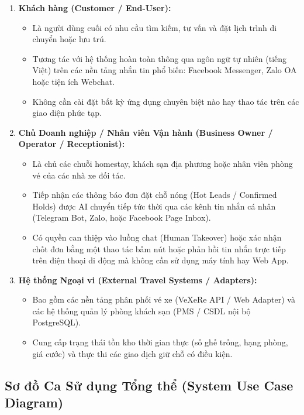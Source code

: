 \begin{enumerate}
    \item \textbf{Khách hàng (Customer / End-User):}
    \begin{itemize}
        \item Là người dùng cuối có nhu cầu tìm kiếm, tư vấn và đặt lịch trình di chuyển hoặc lưu trú.
        \item Tương tác với hệ thống hoàn toàn thông qua ngôn ngữ tự nhiên (tiếng Việt) trên các nền tảng nhắn tin phổ biến: Facebook Messenger, Zalo OA hoặc tiện ích Webchat.
        \item Không cần cài đặt bất kỳ ứng dụng chuyên biệt nào hay thao tác trên các giao diện phức tạp.
    \end{itemize}

    \item \textbf{Chủ Doanh nghiệp / Nhân viên Vận hành (Business Owner / Operator / Receptionist):}
    \begin{itemize}
        \item Là chủ các chuỗi homestay, khách sạn địa phương hoặc nhân viên phòng vé của các nhà xe đối tác.
        \item Tiếp nhận các thông báo đơn đặt chỗ nóng (Hot Leads / Confirmed Holds) được AI chuyển tiếp tức thời qua các kênh tin nhắn cá nhân (Telegram Bot, Zalo, hoặc Facebook Page Inbox).
        \item Có quyền can thiệp vào luồng chat (Human Takeover) hoặc xác nhận chốt đơn bằng một thao tác bấm nút hoặc phản hồi tin nhắn trực tiếp trên điện thoại di động mà không cần sử dụng máy tính hay Web App.
    \end{itemize}

    \item \textbf{Hệ thống Ngoại vi (External Travel Systems / Adapters):}
    \begin{itemize}
        \item Bao gồm các nền tảng phân phối vé xe (VeXeRe API / Web Adapter) và các hệ thống quản lý phòng khách sạn (PMS / CSDL nội bộ PostgreSQL).
        \item Cung cấp trạng thái tồn kho thời gian thực (số ghế trống, hạng phòng, giá cước) và thực thi các giao dịch giữ chỗ có điều kiện.
    \end{itemize}
\end{enumerate}

\subsection{Sơ đồ Ca Sử dụng Tổng thể (System Use Case Diagram)}
\label{subsec:use_case_diagram}

